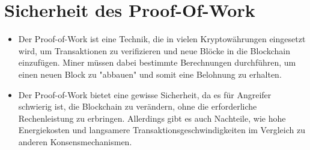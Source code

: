 \documentclass[ngerman]{scrreprt}
\begin{document}
\section{Sicherheit des Proof-Of-Work}

\begin{itemize}
	\item Der Proof-of-Work ist eine Technik, die in vielen Kryptowährungen eingesetzt wird, um Transaktionen zu verifizieren und neue Blöcke in die Blockchain einzufügen. Miner müssen dabei bestimmte Berechnungen durchführen, um einen neuen Block zu "abbauen" und somit eine Belohnung zu erhalten.
	
	\item Der Proof-of-Work bietet eine gewisse Sicherheit, da es für Angreifer schwierig ist, die Blockchain zu verändern, ohne die erforderliche Rechenleistung zu erbringen. Allerdings gibt es auch Nachteile, wie hohe Energiekosten und langsamere Transaktionsgeschwindigkeiten im Vergleich zu anderen Konsensmechanismen.
\end{itemize}
\end{document}
